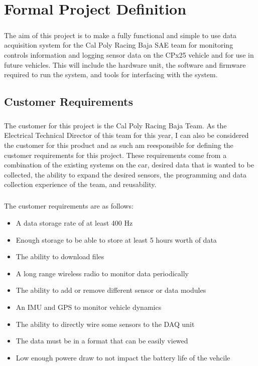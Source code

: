 \chapter{Formal Project Definition}

\paragraph{}
The aim of this project is to make a fully functional and simple to use data acquisition system for the Cal Poly Racing Baja SAE team for monitoring controls information and logging sensor data on the CPx25 vehicle and for use in future vehicles.
This will include the hardware unit, the software and firmware required to run the system, and tools for interfacing with the system.

\section{Customer Requirements}

\paragraph{}
The customer for this project is the Cal Poly Racing Baja Team.
As the Electrical Technical Director of this team for this year, I can also be considered the customer for this product and as such am reesponsible for defining the customer requirements for this project.
These requirements come from a combination of the existing systems on the car, desired data that is wanted to be collected, the ability to expand the desired sensors, the programming and data collection experience of the team, and reusability.

\paragraph{}
The customer requirements are as follows:
\begin{itemize}
	\item A data storage rate of at least 400 Hz
	\item Enough storage to be able to store at least 5 hours worth of data
	\item The ability to download files
	\item A long range wireless radio to monitor data periodically
	\item The ability to add or remove different sensor or data modules
	\item An IMU and GPS to monitor vehicle dynamics
	\item The ability to directly wire some sensors to the DAQ unit
	\item The data must be in a format that can be easily viewed
	\item Low enough powere draw to not impact the battery life of the vehcile
\end{itemize}

